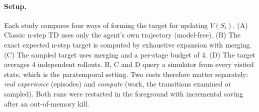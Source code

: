 
\paragraph{Setup.} Each study compares four ways of forming the target for updating $V(S_t)$. (A) Classic n-step TD
uses only the agent's own trajectory (model-free). (B) The exact expected n-step target is computed by exhaustive
expansion with merging. (C) The sampled target uses merging and a per-stage budget of 4. (D) The target averages
4 independent rollouts. B, C and D query a simulator from every visited state, which is the paratemporal setting.
Two costs therefore matter separately: \emph{real experience} (episodes) and \emph{compute} (work, the transitions
examined or sampled). Both runs were restarted in the foreground with incremental saving after an out-of-memory kill.





